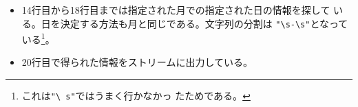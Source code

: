 \begin{frame}[containsverbatim]
\frametitle{}
\begin{itemize}
 \item 14行目から18行目までは指定された月での指定された日の情報を探して
       いる。日を決定する方法も月と同じである。文字列の分割は
       \verb+"\s-\s"+となっている\footnote{これは\texttt{"\textbackslash
       s"}ではうまく行かなかっ
       たためである。}。
 \item 20行目で得られた情報をストリームに出力している。
\end{itemize}
\end{frame}


